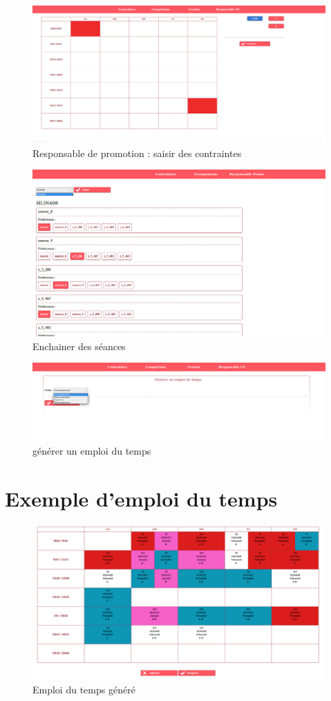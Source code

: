 \documentclass[12pt,a4paper,openany]{memoir}
\begin{document}
\begin{figure}[H]
    \includegraphics[width=19cm, center]{img/annexe/contrainte2.png}
    \caption{Responsable de promotion : saisir des contraintes} \medbreak
\end{figure}

\begin{figure}[H]
    \includegraphics[width=19cm, center]{img/annexe/groupement.png}
    \caption{Enchainer des séances} \medbreak
\end{figure}

\begin{figure}[H]
    \includegraphics[width=19cm, center]{img/annexe/edt_pre.png}
    \caption{générer un emploi du temps} \medbreak
\end{figure}

\section{Exemple d'emploi du temps}
\begin{figure}[H]
    \includegraphics[width=19cm, center]{img/annexe/edt.png}
    \caption{Emploi du temps généré} \medbreak
\end{figure}
\end{document}
